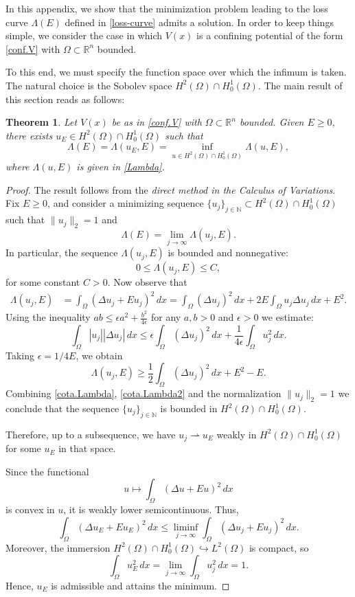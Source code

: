 \documentclass[11pt]{amsart}
\theoremstyle{definition}
\theoremstyle{remark}
\theoremstyle{plain}
\newtheorem{theorem}{Theorem}
\newcommand{\R}{\mathbb{R}}
\newcommand{\N}{\mathbb{N}}
\begin{document}
In this appendix, we show that the minimization problem leading to the loss curve $\Lambda(E)$ defined in \eqref{loss-curve} admits a solution. In order to keep things simple, we consider the case in which $V(x)$ is a confining potential of the form \eqref{conf.V} with $\Omega\subset \R^n$ bounded.

To this end, we must specify the function space over which the infimum is taken. The natural choice is the Sobolev space $H^2(\Omega) \cap H^1_0(\Omega)$. The main result of this section reads as follows:

\begin{theorem}\label{teo.min}
Let $V(x)$ be as in \eqref{conf.V} with $\Omega\subset \R^n$ bounded. Given $E\ge 0$, there exists $u_E\in H^2(\Omega)\cap H^1_0(\Omega)$ such that
$$
\Lambda(E) = \Lambda(u_E, E) = \inf_{u\in H^2(\Omega)\cap H^1_0(\Omega)}\Lambda(u, E),
$$
where $\Lambda(u, E)$ is given in \eqref{Lambda}.
\end{theorem}

\begin{proof}
The result follows from the \emph{direct method in the Calculus of Variations}. Fix $E \ge 0$, and consider a minimizing sequence $\{u_j\}_{j \in \N} \subset H^2(\Omega) \cap H^1_0(\Omega)$ such that $\|u_j\|_2 = 1$ and
$$
\Lambda(E) = \lim_{j \to \infty} \Lambda(u_j, E).
$$
In particular, the sequence $\Lambda(u_j, E)$ is bounded and nonnegative:
\begin{equation}\label{cota.Lambda}
0 \le \Lambda(u_j, E) \le C,
\end{equation}
for some constant $C > 0$. Now observe that
\begin{align*}
\Lambda(u_j, E) &= \int_\Omega (\Delta u_j + Eu_j)^2\, dx = \int_\Omega (\Delta u_j)^2\, dx + 2E\int_\Omega u_j \Delta u_j \, dx+ E^2.
\end{align*}
Using the inequality $ab\le \epsilon a^2 + \frac{b^2}{4\epsilon}$ for any $a, b>0$ and $\epsilon >0$ we estimate:
$$
\int_\Omega |u_j| |\Delta u_j|\, dx \le \epsilon \int_\Omega (\Delta u_j)^2\, dx + \frac{1}{4\epsilon}\int_\Omega u_j^2\, dx.
$$
Taking $\epsilon=1/4E$, we obtain
\begin{equation}\label{cota.Lambda2}
\Lambda(u_j, E)\ge \frac12 \int_\Omega (\Delta u_j)^2\, dx + E^2-E.
\end{equation}
Combining \eqref{cota.Lambda}, \eqref{cota.Lambda2} and the normalization $\|u_j\|_2=1$ we conclude that the sequence $\{u_j\}_{j\in\N}$ is bounded in $H^2(\Omega)\cap H^1_0(\Omega)$.

Therefore, up to a subsequence, we have $u_j \rightharpoonup u_E$ weakly in $H^2(\Omega) \cap H^1_0(\Omega)$ for some $u_E$ in that space.

Since the functional
$$
u \mapsto \int_\Omega (\Delta u + E u)^2\, dx
$$
is convex in $u$, it is weakly lower semicontinuous. Thus,
$$
\int_\Omega (\Delta u_E + E u_E)^2\, dx \le \liminf_{j \to \infty} \int_\Omega (\Delta u_j + E u_j)^2\, dx.
$$
Moreover, the immersion $H^2(\Omega)\cap H^1_0(\Omega)\hookrightarrow L^2(\Omega)$ is compact, so
$$
\int_\Omega u_E^2\, dx = \lim_{j\to\infty} \int_\Omega u_j^2\, dx = 1.
$$
Hence, $u_E$ is admissible and attains the minimum.
\end{proof}
\end{document}
